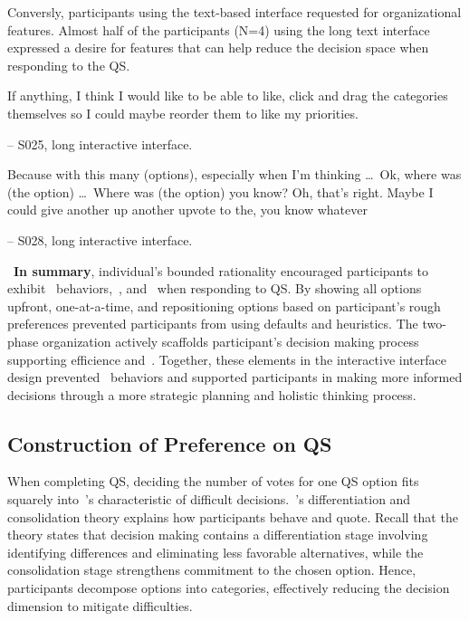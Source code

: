 Conversly, participants using the text-based interface requested for organizational features. Almost half of the participants (N=4) using the long text interface expressed a desire for features that can help reduce the decision space when responding to the QS.

\begin{displayquote}
If anything, I think I would like to be able to like, click and drag the categories themselves so I could maybe reorder them to like my priorities.

\noindent \hfill -- S025, long interactive interface.
\end{displayquote}

\begin{displayquote}
Because with this many (options), especially when I'm thinking \ldots\ Ok, where was (the option) \ldots\ Where was (the option) you know? Oh, that's right. Maybe I could give another up another upvote to the, you know whatever~\bracketellipsis

\noindent \hfill -- S028, long interactive interface.
\end{displayquote}

~\textbf{In summary}, individual's bounded rationality encouraged participants to exhibit~\underline{} behaviors,~\underline{}, and~\underline{} when responding to QS. By showing all options upfront, one-at-a-time, and repositioning options based on participant's rough preferences prevented participants from using defaults and heuristics. The two-phase organization actively scaffolds participant's decision making process supporting efficience\underline{} and~\underline{}. Together, these elements in the interactive interface design prevented~\underline{} behaviors and supported participants in making more informed decisions through a more strategic planning and holistic thinking process.



\subsection{Construction of Preference on QS}

When completing QS, deciding the number of votes for one QS option fits squarely into~\textcite{lichtensteinConstructionPreference2006}'s characteristic of difficult decisions.~\textcite{svensonDifferentiationConsolidationTheory1992}'s differentiation and consolidation theory explains how participants behave and quote. Recall that the theory states that decision making contains a differentiation stage involving identifying differences and eliminating less favorable alternatives, while the consolidation stage strengthens commitment to the chosen option. Hence, participants decompose options into categories, effectively reducing the decision dimension to mitigate difficulties.

